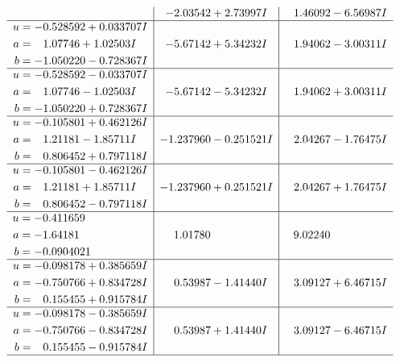\documentclass[1p]{elsarticle_modified}
\theoremstyle{definition}
\begin{document}
$$\begin{array}{c|c|c}
 & -2.03542 + 2.73997 I & \phantom{-}1.46092 - 6.56987 I \\ \hline\begin{aligned}
u &= -0.528592 + 0.033707 I \\
a &= \phantom{-}1.07746 + 1.02503 I \\
b &= -1.050220 - 0.728367 I\end{aligned}
 & -5.67142 + 5.34232 I & \phantom{-}1.94062 - 3.00311 I \\ \hline\begin{aligned}
u &= -0.528592 - 0.033707 I \\
a &= \phantom{-}1.07746 - 1.02503 I \\
b &= -1.050220 + 0.728367 I\end{aligned}
 & -5.67142 - 5.34232 I & \phantom{-}1.94062 + 3.00311 I \\ \hline\begin{aligned}
u &= -0.105801 + 0.462126 I \\
a &= \phantom{-}1.21181 - 1.85711 I \\
b &= \phantom{-}0.806452 + 0.797118 I\end{aligned}
 & -1.237960 - 0.251521 I & \phantom{-}2.04267 - 1.76475 I \\ \hline\begin{aligned}
u &= -0.105801 - 0.462126 I \\
a &= \phantom{-}1.21181 + 1.85711 I \\
b &= \phantom{-}0.806452 - 0.797118 I\end{aligned}
 & -1.237960 + 0.251521 I & \phantom{-}2.04267 + 1.76475 I \\ \hline\begin{aligned}
u &= -0.411659\phantom{ +0.000000I} \\
a &= -1.64181\phantom{ +0.000000I} \\
b &= -0.0904021\phantom{ +0.000000I}\end{aligned}
 & \phantom{-}1.01780\phantom{ +0.000000I} & \phantom{-}9.02240\phantom{ +0.000000I} \\ \hline\begin{aligned}
u &= -0.098178 + 0.385659 I \\
a &= -0.750766 + 0.834728 I \\
b &= \phantom{-}0.155455 + 0.915784 I\end{aligned}
 & \phantom{-}0.53987 - 1.41440 I & \phantom{-}3.09127 + 6.46715 I \\ \hline\begin{aligned}
u &= -0.098178 - 0.385659 I \\
a &= -0.750766 - 0.834728 I \\
b &= \phantom{-}0.155455 - 0.915784 I\end{aligned}
 & \phantom{-}0.53987 + 1.41440 I & \phantom{-}3.09127 - 6.46715 I\\
 \hline 
 \end{array}$$\newpage\newpage\renewcommand{\arraystretch}{1}
\end{document}
